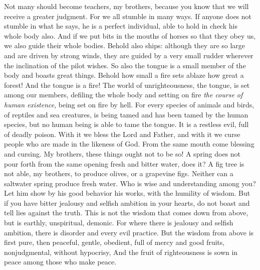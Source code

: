 \begin{biblechapter} %
 Not many should become teachers, my brothers, because you know that we will receive a greater judgment.
\verse For we all stumble in many ways. If anyone does not stumble in what he says, he is a perfect individual, able to hold in check his whole body also.
\verse And if we put bits in the mouths of horses so that they obey us, we also guide their whole bodies.
\verse Behold also ships: although they are so large and are driven by strong winds, they are guided by a very small rudder wherever the inclination of the pilot wishes.
\verse So also the tongue is a small member of the body and boasts great things. Behold how small a fire sets ablaze how great a forest!
\verse And the tongue is a fire! The world of unrighteousness, the tongue, is set among our members, defiling the whole body and setting on fire \textit{the course of human existence}, being set on fire by hell.
\verse For every species of animals and birds, of reptiles and sea creatures, is being tamed and has been tamed by the human species,
\verse but no human being is able to tame the tongue. It is a restless evil, full of deadly poison.
\verse With it we bless the Lord and Father, and with it we curse people who are made in the likeness of God.
\verse From the same mouth come blessing and cursing. My brothers, these things ought not to be so!
\verse A spring does not pour forth from the same opening fresh and bitter water, does it?
\verse A fig tree is not able, my brothers, to produce olives, or a grapevine figs. Neither can a saltwater spring produce fresh water.
 Who is wise and understanding among you? Let him show by his good behavior his works, with the humility of wisdom.
\verse But if you have bitter jealousy and selfish ambition in your hearts, do not boast and tell lies against the truth.
\verse This is not the wisdom that comes down from above, but is earthly, unspiritual, demonic.
\verse For where there is jealousy and selfish ambition, there is disorder and every evil practice.
\verse But the wisdom from above is first pure, then peaceful, gentle, obedient, full of mercy and good fruits, nonjudgmental, without hypocrisy,
\verse And the fruit of righteousness is sown in peace among those who make peace.
\end{biblechapter}


